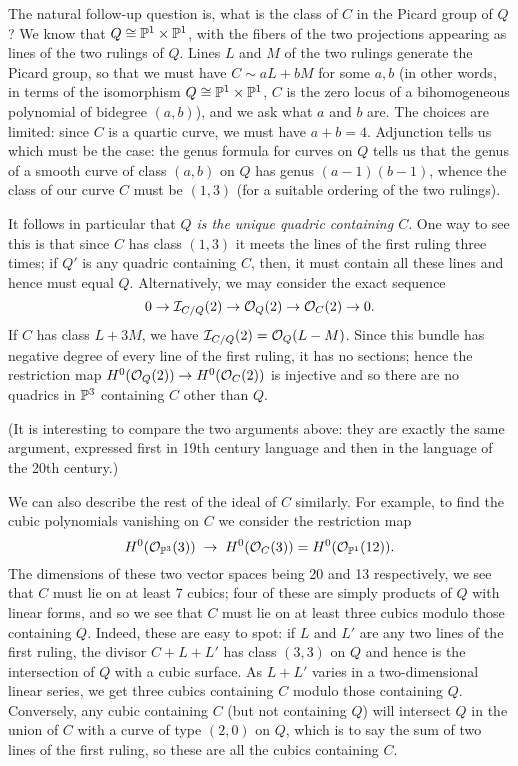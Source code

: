 The natural follow-up question is, what is the class of $C$ in the Picard group of $Q$? We know that $Q \cong \PP^1 \times \PP^1$, with the fibers of the two projections appearing as lines of the two rulings of $Q$. Lines $L$ and $M$ of the two rulings generate the Picard group, so that we must have $C \sim aL + bM$ for some $a, b$ (in other words, in terms of the isomorphism $Q \cong \PP^1 \times \PP^1$, $C$ is the zero locus of a bihomogeneous polynomial of bidegree $(a,b)$), and we ask what $a$ and $b$ are. The choices are limited: since $C$ is a quartic curve, we must have $a+b = 4$. Adjunction tells us which must be the case: the genus formula for curves on $Q$ tells us that the genus of a smooth curve of class $(a,b)$ on $Q$ has genus $(a-1)(b-1)$, whence the class of our curve $C$ must be $(1,3)$ (for a suitable ordering of the two rulings).

It follows in particular that \emph{$Q$ is the unique quadric containing $C$}. One way to see this is that since $C$ has class $(1,3)$ it meets the lines of the first ruling three times; if $Q'$ is any quadric containing $C$, then, it must contain all these lines and hence must equal $Q$. Alternatively, we may consider the exact sequence
$$
0 \to \cI_{C/Q}(2) \to \cO_Q(2)  \to \cO_C(2) \to 0.
$$
If $C$ has class $L+3M$, we have $\cI_{C/Q}(2) = \cO_{Q}(L-M)$. Since this bundle has negative degree of every line of the first ruling, it has no sections; hence the restriction map $H^0(\cO_Q(2))  \to H^0(\cO_C(2))$ is injective and so there are no  quadrics in $\PP^3$ containing $C$ other than $Q$.

(It is interesting to compare the two arguments above: they are exactly the same argument, expressed first in 19th century language and then in the language of the 20th century.)

We can also describe the rest of the ideal of $C$ similarly. For example, to find the cubic polynomials vanishing on $C$ we consider the restriction map
$$
H^0(\cO_{\PP^3}(3)) \; \to \; H^0(\cO_{C}(3)) = H^0(\cO_{\PP^1}(12)).
$$
The dimensions of these two vector spaces being 20 and 13 respectively, we see that $C$ must lie on at least 7 cubics; four of these are simply products of $Q$ with linear forms, and so we see that $C$ must lie on at least three cubics modulo those containing $Q$. Indeed, these are easy to spot: if $L$ and $L'$ are any two lines of the first ruling, the divisor $C + L + L'$ has class $(3,3)$ on $Q$ and hence is the intersection of $Q$ with a cubic surface. As $L+L'$ varies in a two-dimensional linear series, we get three cubics containing $C$ modulo those containing $Q$. Conversely, any cubic containing $C$ (but not containing $Q$) will intersect $Q$ in the union of $C$ with a curve of type $(2,0)$ on $Q$, which is to say the sum of two lines of the first ruling, so these are all the cubics containing $C$.

